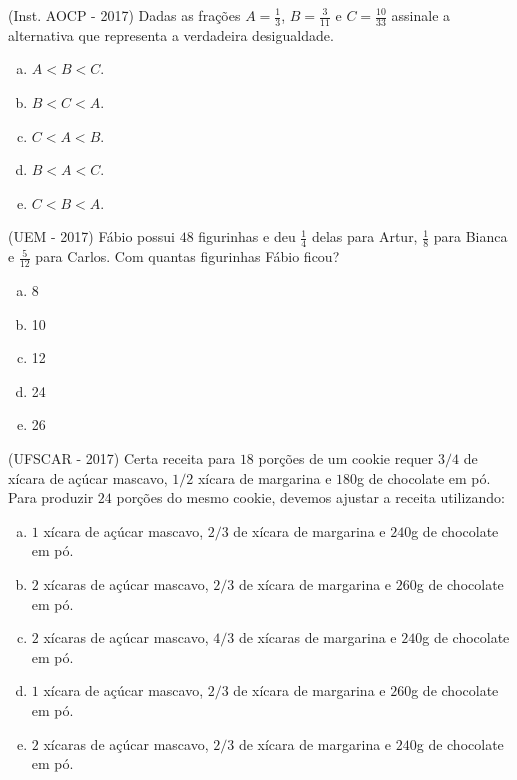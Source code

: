  \begin{exer}
 (Inst. AOCP - 2017) Dadas as frações $A= \frac{1}{3}$, $B= \frac{3}{11}$ e $C= \frac{10}{33}$ assinale a alternativa que representa a verdadeira desigualdade.
  \begin{enumerate}[a)]
  \item $A < B < C$.
  \item $B < C < A$.
  \item $C < A < B$.
  \item $B < A < C$.
  \item $C < B < A$.
  \end{enumerate}
 \end{exer}

 \begin{exer}
 (UEM - 2017) Fábio possui $48$ figurinhas e deu $\frac{1}{4}$ delas para Artur, $\frac{1}{8}$ para Bianca e $\frac{5}{12}$ para Carlos. Com quantas figurinhas Fábio ficou?
  \begin{enumerate}[a)]
  \item 8
  \item 10
  \item 12
  \item 24
  \item 26
  \end{enumerate}
 \end{exer}

 \begin{exer}
 (UFSCAR - 2017) Certa receita para $18$ porções de um cookie requer $3/4$ de xícara de açúcar mascavo, $1/2$ xícara de margarina e $180$g de chocolate em pó. Para produzir $24$ porções do mesmo cookie, devemos ajustar a receita utilizando:
   \begin{enumerate}[a)]
  \item $1$ xícara de açúcar mascavo, $2/3$ de xícara de margarina e $240$g de chocolate em pó.
  \item $2$ xícaras de açúcar mascavo, $2/3$ de xícara de margarina e $260$g de chocolate em pó.
  \item $2$ xícaras de açúcar mascavo, $4/3$ de xícaras de margarina e $240$g de chocolate em pó.
  \item $1$ xícara de açúcar mascavo, $2/3$ de xícara de margarina e $260$g de chocolate em pó.
  \item $2$ xícaras de açúcar mascavo, $2/3$ de xícara de margarina e $240$g de chocolate em pó.
  \end{enumerate}
 \end{exer}

